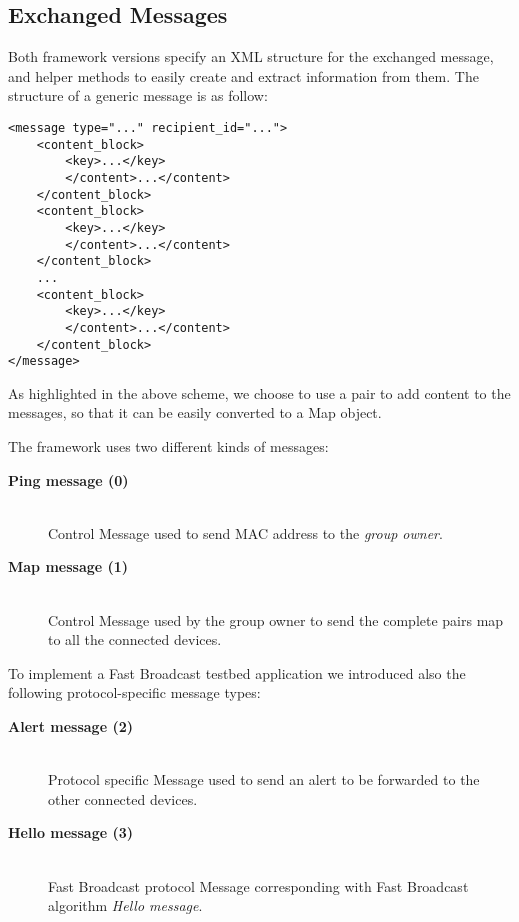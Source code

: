\subsection{Exchanged Messages}
Both framework versions specify an XML structure for the exchanged message, and helper methods to easily create and extract information from them. The structure of a generic message is as follow:
\begin{verbatim}
<message type="..." recipient_id="...">
    <content_block>
        <key>...</key>
        </content>...</content>
    </content_block>
    <content_block>
        <key>...</key>
        </content>...</content>
    </content_block>
    ...
    <content_block>
        <key>...</key>
        </content>...</content>
    </content_block>
</message>
\end{verbatim}
As highlighted in the above scheme, we choose to use a  pair to add content to the messages, so that it can be easily converted to a Map object.

The framework uses two different kinds of messages:
	\begin{description}
		\item[\textbf{Ping message (0)}] \hfill \\
		Control Message used to send MAC address to the \textit{group owner}.
		\item[\textbf{Map message (1)}] \hfill \\
		Control Message used by the group owner to send the complete  pairs map to all the connected devices.
	\end{description}
To implement a Fast Broadcast testbed application we introduced also the following protocol-specific message types:
	\begin{description}
		\item[\textbf{Alert message (2)}] \hfill \\
		Protocol specific Message used to send an alert to be forwarded to the other connected devices.
		\item[\textbf{Hello message (3)}] \hfill \\
		Fast Broadcast protocol Message corresponding with Fast Broadcast algorithm \textit{Hello message}.
	\end{description}
